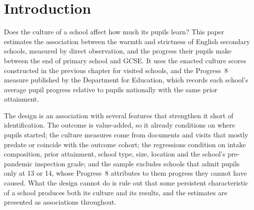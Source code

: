 
\section{Introduction}
\label{sec:p2_intro}

Does the culture of a school affect how much its pupils learn? This paper
estimates the association between the warmth and strictness of English
secondary schools, measured by direct observation, and the progress their
pupils make between the end of primary school and GCSE. It uses the enacted
culture scores constructed in the previous chapter for \NTierOne{} visited
schools, and the Progress~8 measure published by the Department for
Education, which records each school's average pupil progress relative to
pupils nationally with the same prior attainment.

The design is an association with several features that strengthen it short
of identification. The outcome is value-added, so it already conditions on
where pupils started; the culture measures come from documents and visits that
mostly predate or coincide with the outcome cohort; the regressions condition
on intake composition, prior attainment, school type, size, location and the
school's pre-pandemic inspection grade; and the sample excludes schools that
admit pupils only at 13 or 14, whose Progress~8 attributes to them progress
they cannot have caused. What the design cannot do is rule out that some
persistent characteristic of a school produces both its culture and its
results, and the estimates are presented as associations throughout.

